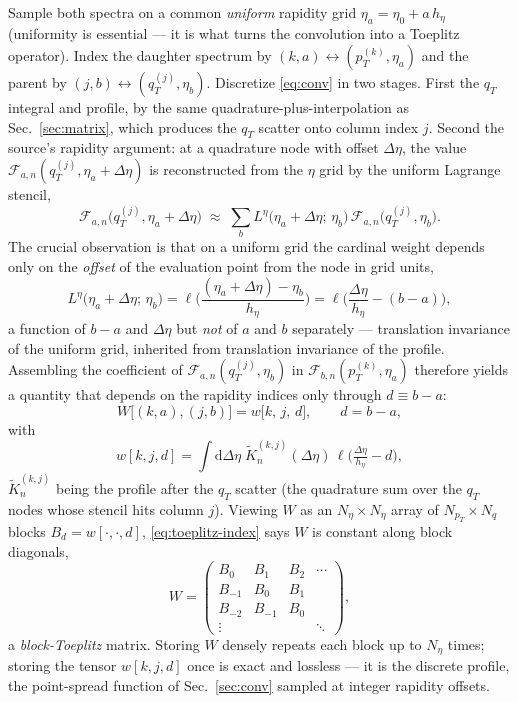 \documentclass[11pt]{article}
\newcommand{\Fan}{\mathcal{F}_{a,n}}
\newcommand{\Fbn}{\mathcal{F}_{b,n}}
\begin{document}
Sample both spectra on a common \emph{uniform} rapidity grid
$\eta_a=\eta_0+a\,h_\eta$ (uniformity is essential --- it is what turns the
convolution into a Toeplitz operator).  Index the daughter spectrum by
$(k,a)\leftrightarrow(p_T^{(k)},\eta_a)$ and the parent by
$(j,b)\leftrightarrow(q_T^{(j)},\eta_b)$.  Discretize \eqref{eq:conv} in
two stages.  First the $q_T$ integral and profile, by the same
quadrature-plus-interpolation as Sec.~\ref{sec:matrix}, which produces the
$q_T$ scatter onto column index $j$.  Second the source's rapidity
argument: at a quadrature node with offset $\Delta\eta$, the value
$\Fan(q_T^{(j)},\eta_a+\Delta\eta)$ is reconstructed from the $\eta$ grid
by the uniform Lagrange stencil,
\begin{equation}
\Fan\big(q_T^{(j)},\eta_a+\Delta\eta\big)
\;\approx\;
\sum_{b} L^\eta\!\big(\eta_a+\Delta\eta;\,\eta_b\big)\,
\Fan\big(q_T^{(j)},\eta_b\big).
\end{equation}
The crucial observation is that on a uniform grid the cardinal weight
depends only on the \emph{offset} of the evaluation point from the node in
grid units,
\begin{equation}
L^\eta\big(\eta_a+\Delta\eta;\,\eta_b\big)
=\ell\!\Big(\frac{(\eta_a+\Delta\eta)-\eta_b}{h_\eta}\Big)
=\ell\Big(\frac{\Delta\eta}{h_\eta}-(b-a)\Big),
\label{eq:offsetweight}
\end{equation}
a function of $b-a$ and $\Delta\eta$ but \emph{not} of $a$ and $b$
separately --- translation invariance of the uniform grid, inherited from
translation invariance of the profile.  Assembling the coefficient of
$\Fan(q_T^{(j)},\eta_b)$ in $\Fbn(p_T^{(k)},\eta_a)$ therefore yields a
quantity that depends on the rapidity indices only through $d\equiv b-a$:
\begin{equation}
W\big[(k,a),(j,b)\big]=w\big[k,\,j,\,d\big],
\qquad d=b-a,
\label{eq:toeplitz-index}
\end{equation}
with
\begin{equation}
w[k,j,d]=
\int\!\mathrm{d}\Delta\eta\;\widetilde K_n^{(k,j)}(\Delta\eta)\,
\ell\!\Big(\tfrac{\Delta\eta}{h_\eta}-d\Big),
\label{eq:wtensor}
\end{equation}
$\widetilde K_n^{(k,j)}$ being the profile after the $q_T$
scatter (the quadrature sum over the $q_T$ nodes whose stencil hits column
$j$).  Viewing $W$ as an $N_\eta\times N_\eta$ array of
$N_{p_T}\times N_q$ blocks $B_d=w[\cdot,\cdot,d]$, \eqref{eq:toeplitz-index}
says $W$ is constant along block diagonals,
\begin{equation}
W=
\begin{pmatrix}
B_0 & B_1 & B_2 & \cdots\\
B_{-1} & B_0 & B_1 & \\
B_{-2} & B_{-1} & B_0 & \\
\vdots & & & \ddots
\end{pmatrix},
\end{equation}
a \emph{block-Toeplitz} matrix.  Storing $W$ densely repeats each block up
to $N_\eta$ times; storing the tensor $w[k,j,d]$ once is exact and lossless
--- it is the discrete profile, the point-spread function of
Sec.~\ref{sec:conv} sampled at integer rapidity offsets.
\end{document}
